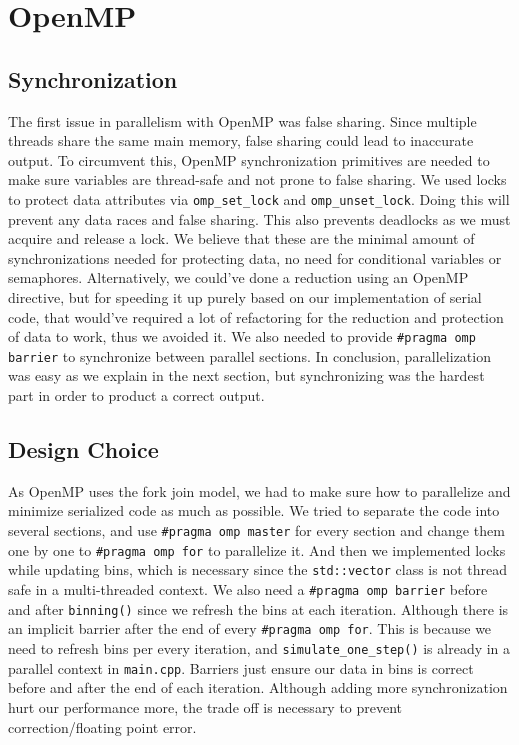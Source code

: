 \documentclass{article}
\begin{document}
\section{OpenMP}
\subsection{Synchronization}
The first issue in parallelism with OpenMP was false sharing. Since multiple threads share the same main memory, false sharing could lead to inaccurate output. To circumvent this, OpenMP synchronization primitives are needed to make sure variables are thread-safe and not prone to false sharing. We used locks to protect data attributes via \verb|omp_set_lock| and \verb|omp_unset_lock|. Doing this will prevent any data races and false sharing. This also prevents deadlocks as we must acquire and release a lock. We believe that these are the minimal amount of synchronizations needed for protecting data, no need for conditional variables or semaphores. Alternatively, we could've done a reduction using an OpenMP directive, but for speeding it up purely based on our implementation of serial code, that would've required a lot of refactoring for the reduction and protection of data to work, thus we avoided it. We also needed to provide \verb|#pragma omp barrier| to synchronize between parallel sections. In conclusion, parallelization was easy as we explain in the next section, but synchronizing was the hardest part in order to product a correct output.

\subsection{Design Choice}
As OpenMP uses the fork join model, we had to make sure how to parallelize and minimize serialized code as much as possible. We tried to separate the code into several sections, and use \verb|#pragma omp master| for every section and change them one by one to \verb|#pragma omp for| to parallelize it. And then we implemented locks while updating bins, which is necessary since the \verb|std::vector| class is not thread safe in a multi-threaded context. We also need a \verb|#pragma omp barrier| before and after \verb|binning()| since we refresh the bins at each iteration. Although there is an implicit barrier after the end of every \verb|#pragma omp for|. This is because we need to refresh bins per every iteration, and \verb|simulate_one_step()| is already in a parallel context in \verb|main.cpp|. Barriers just ensure our data in bins is correct before and after the end of each iteration. Although adding more synchronization hurt our performance more, the trade off is necessary to prevent correction/floating point error. 
\end{document}

